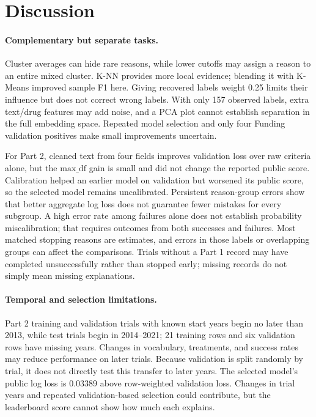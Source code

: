 \documentclass[10pt,twocolumn,letterpaper]{article}
\begin{document}
\section{Discussion}
\paragraph{Complementary but separate tasks.}
Cluster averages can hide rare reasons, while lower cutoffs may assign a reason
to an entire mixed cluster. K-NN provides more local evidence; blending it with
K-Means improved sample F1 here. Giving recovered labels weight 0.25 limits their
influence but does not correct wrong labels. With only 157 observed labels,
extra text/drug features may add noise, and a PCA plot cannot establish separation
in the full embedding space. Repeated model selection and only four Funding
validation positives make small improvements uncertain.

For Part 2, cleaned text from four fields improves validation loss over raw
criteria alone, but the $\mathrm{max\_df}$ gain is small and did not change the
reported public score. Calibration helped an earlier model on validation but
worsened its public score, so the selected model remains uncalibrated.
Persistent reason-group errors show that better aggregate log loss does not
guarantee fewer mistakes for every subgroup. A high error rate among failures
alone does not establish probability miscalibration; that requires outcomes
from both successes and failures.
Most matched stopping reasons are estimates, and errors in those labels or
overlapping groups can affect the comparisons. Trials without a Part 1 record
may have completed unsuccessfully rather than stopped early; missing records
do not simply mean missing explanations.

\paragraph{Temporal and selection limitations.}
Part 2 training and validation trials with known start years begin no later than
2013, while test trials begin in 2014--2021; 21 training rows and six validation
rows have missing years. Changes in vocabulary, treatments, and success rates
may reduce performance on later trials. Because validation is split randomly
by trial, it does not directly test this transfer to later years. The selected
model's public log loss is 0.03389 above row-weighted validation loss. Changes
in trial years and repeated validation-based selection could contribute, but
the leaderboard score cannot show how much each explains.
\end{document}
